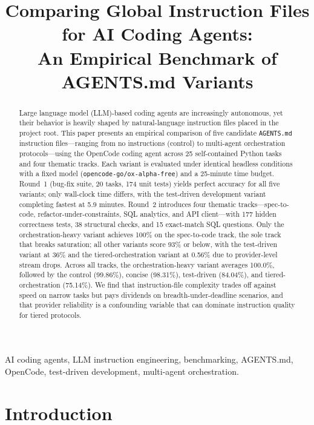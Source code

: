 \documentclass[journal]{IEEEtran}
\title{Comparing Global Instruction Files for AI Coding Agents:\\An Empirical Benchmark of AGENTS.md Variants}
\author{
\IEEEauthorblockN{Sathvik A~R}
\IEEEauthorblockA{PES University\\Bengaluru, India\\arsathvik48@gmail.com}
}
\begin{document}
\maketitle

\begin{abstract}
Large language model (LLM)-based coding agents are increasingly autonomous, yet their
behavior is heavily shaped by natural-language instruction files placed in the project root.
This paper presents an empirical comparison of five candidate \texttt{AGENTS.md} instruction
files---ranging from no instructions (control) to multi-agent orchestration protocols---using
the OpenCode coding agent across 25 self-contained Python tasks and four thematic tracks.
Each variant is evaluated under identical headless conditions with a fixed model
(\texttt{opencode-go/ox-alpha-free}) and a 25-minute time budget.
Round~1 (bug-fix suite, 20 tasks, 174 unit tests) yields perfect accuracy for all five
variants; only wall-clock time differs, with the test-driven development variant completing
fastest at 5.9 minutes.
Round~2 introduces four thematic tracks---spec-to-code, refactor-under-constraints, SQL
analytics, and API client---with 177 hidden correctness tests, 38 structural checks, and
15 exact-match SQL questions.
Only the orchestration-heavy variant achieves 100\% on the spec-to-code track, the sole
track that breaks saturation; all other variants score 93\% or below, with the
test-driven variant at 36\% and the tiered-orchestration variant at 0.56\% due to
provider-level stream drops.
Across all tracks, the orchestration-heavy variant averages 100.0\%, followed by the
control (99.86\%), concise (98.31\%), test-driven (84.04\%), and tiered-orchestration
(75.14\%).
We find that instruction-file complexity trades off against speed on narrow tasks but
pays dividends on breadth-under-deadline scenarios, and that provider reliability
is a confounding variable that can dominate instruction quality for tiered protocols.
\end{abstract}

\begin{IEEEkeywords}
AI coding agents, LLM instruction engineering, benchmarking, AGENTS.md, OpenCode,
test-driven development, multi-agent orchestration.
\end{IEEEkeywords}

\section{Introduction}
\label{sec:intro}
\end{document}
